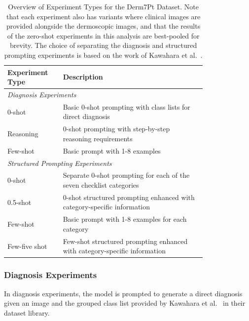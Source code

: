 \documentclass[../ShajiS_RnDReport.tex]{subfiles}
\begin{document}
\begin{table}[ht]
    \centering
    \begin{tabular}{p{0.2\linewidth}p{0.6\linewidth}}
        \hline
        \textbf{Experiment Type} & \textbf{Description} \\
        \hline
        \multicolumn{2}{l}{\textit{Diagnosis Experiments}} \\
        0-shot & Basic 0-shot prompting with class lists for direct diagnosis \\
        Reasoning & 0-shot prompting with step-by-step reasoning requirements \\
        Few-shot & Basic prompt with 1-8 examples \\
        \hline
        \multicolumn{2}{l}{\textit{Structured Prompting Experiments}} \\
        0-shot & Separate 0-shot prompting for each of the seven checklist categories \\
        0.5-shot & 0-shot structured prompting enhanced with category-specific information \\
        Few-shot & Basic prompt with 1-8 examples for each category \\
        Few-five shot & Few-shot structured prompting enhanced with category-specific information \\
        \hline
    \end{tabular}
    \caption{Overview of Experiment Types for the Derm7Pt Dataset. Note that each experiment also has variants where clinical images are provided alongside the dermoscopic images, and that the results of the zero-shot experiments in this analysis are best-pooled for brevity. The choice of separating the diagnosis and structured prompting experiments is based on the work of Kawahara et al.~\cite{Kawahara2019}.}
    \label{tab:derm7pt_experiment_types}
\end{table}

\subsubsection{Diagnosis Experiments}
In diagnosis experiments, the model is prompted to generate a direct diagnosis given an image and the grouped class list provided by Kawahara et al.~\cite{Kawahara2019} in their dataset library.
\end{document}
